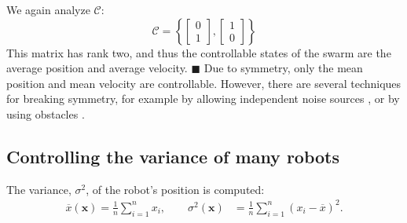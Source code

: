 We again analyze $\mathcal{C}$:
\begin{equation}
\mathcal{C}=\left\{ \begin{bmatrix} 
0\\
1
\end{bmatrix}
,
 \begin{bmatrix} 
1\\
0
\end{bmatrix}
 \right\}
\end{equation}
This matrix has rank two, and thus the controllable states of the swarm are the average position and average velocity.
$\blacksquare$ 
Due to symmetry, only the mean position and mean velocity are controllable. However, there are several techniques for breaking symmetry, for example by allowing independent noise sources \cite{beckerIJRR2014}, or by using obstacles \cite{Becker2013b}.

\subsection{Controlling the variance of many robots}\label{sec:VarianceControl}

The variance, $\sigma^2$, of the robot's position is computed:
\begin{align}
 \overline{x}(\mathbf{x}) = \frac{1}{n} \sum_{i=1}^n x_i, \qquad  %
\sigma^2(\mathbf{x}) &= \frac{1}{n} \sum_{i=1}^n (x_i - \overline{x})^2.  %
\end{align}

